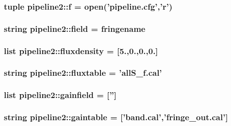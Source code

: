 \hypertarget{namespacepipeline2_a6b1a836bf4ef6f77f89cf996d1441378}{
\subsubsection[{f}]{\setlength{\rightskip}{0pt plus 5cm}tuple {\bf pipeline2\-::f} = open('pipeline.\-cfg','r')}}\label{namespacepipeline2_a6b1a836bf4ef6f77f89cf996d1441378}
\hypertarget{namespacepipeline2_aa8e85b4cb202f0b59a2563d6c2a6e345}{
\subsubsection[{field}]{\setlength{\rightskip}{0pt plus 5cm}string {\bf pipeline2\-::field} = fringename}}\label{namespacepipeline2_aa8e85b4cb202f0b59a2563d6c2a6e345}
\hypertarget{namespacepipeline2_a65fe7b638c2ec2dbe122309794a26e61}{
\subsubsection[{fluxdensity}]{\setlength{\rightskip}{0pt plus 5cm}list {\bf pipeline2\-::fluxdensity} = \mbox{[}5.,0.,0.,0.\mbox{]}}}\label{namespacepipeline2_a65fe7b638c2ec2dbe122309794a26e61}
\hypertarget{namespacepipeline2_a38feb1a89a8db932571973723e4659dc}{
\subsubsection[{fluxtable}]{\setlength{\rightskip}{0pt plus 5cm}string {\bf pipeline2\-::fluxtable} = 'all\-S\-\_\-f.\-cal'}}\label{namespacepipeline2_a38feb1a89a8db932571973723e4659dc}
\hypertarget{namespacepipeline2_adad67970585fa9911fceaa757e0f4a91}{
\subsubsection[{gainfield}]{\setlength{\rightskip}{0pt plus 5cm}list {\bf pipeline2\-::gainfield} = \mbox{[}''\mbox{]}}}\label{namespacepipeline2_adad67970585fa9911fceaa757e0f4a91}
\hypertarget{namespacepipeline2_a433a42f72e521b82226be074a8d1b20e}{
\subsubsection[{gaintable}]{\setlength{\rightskip}{0pt plus 5cm}string {\bf pipeline2\-::gaintable} = \mbox{[}'band.\-cal','fringe\-\_\-out.\-cal'\mbox{]}}}\label{namespacepipeline2_a433a42f72e521b82226be074a8d1b20e}
